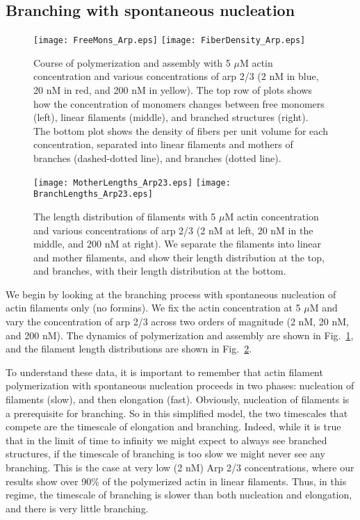 \documentclass[11pt]{article}
\begin{document}
\subsection{Branching with spontaneous nucleation \label{sec:BrSN}}

\begin{figure}
\centering
\texttt{[image: FreeMons\_Arp.eps]}
\texttt{[image: FiberDensity\_Arp.eps]}
\caption{\label{fig:PolyDynamicsArp}Course of polymerization and assembly with 5 $\mu$M actin concentration and various concentrations of arp 2/3 (2 nM in blue, 20 nM in red, and 200 nM in yellow). The top row of plots shows how the concentration of monomers changes between free monomers (left), linear filaments (middle), and branched structures (right). The bottom plot shows the density of fibers per unit volume for each concentration, separated into linear filaments and mothers of branches (dashed-dotted line), and branches (dotted line).  }
\end{figure}

\begin{figure}
\centering
\texttt{[image: MotherLengths\_Arp23.eps]}
\texttt{[image: BranchLengths\_Arp23.eps]}
\caption{\label{fig:LengthDistsArp} The length distribution of filaments with 5 $\mu$M actin concentration and various concentrations of arp 2/3 (2 nM at left, 20 nM in the middle, and 200 nM at right). We separate the filaments into linear and mother filaments, and show their length distribution at the top, and branches, with their length distribution at the bottom. }
\end{figure}

We begin by looking at the branching process with spontaneous nucleation of actin filaments only (no formins). We fix the actin concentration at 5 $\mu$M and vary the concentration of arp 2/3 across two orders of magnitude (2 nM, 20 nM, and 200 nM). The dynamics of polymerization and assembly are shown in Fig.\ \ref{fig:PolyDynamicsArp}, and the filament length distributions are shown in Fig.\ \ref{fig:LengthDistsArp}. 

To understand these data, it is important to remember that actin filament polymerization with spontaneous nucleation proceeds in two phases: nucleation of filaments (slow), and then elongation (fast). Obviously, nucleation of filaments is a prerequisite for branching. So in this simplified model, the two timescales that compete are the timescale of elongation and branching. Indeed, while it is true that in the limit of time to infinity we might expect to always see branched structures, if the timescale of branching is too slow we might never see any branching. This is the case at very low (2 nM) Arp 2/3 concentrations, where our results show over 90\% of the polymerized actin in linear filaments. Thus, in this regime, the timescale of branching is slower than both nucleation and elongation, and there is very little branching. 
\end{document}
